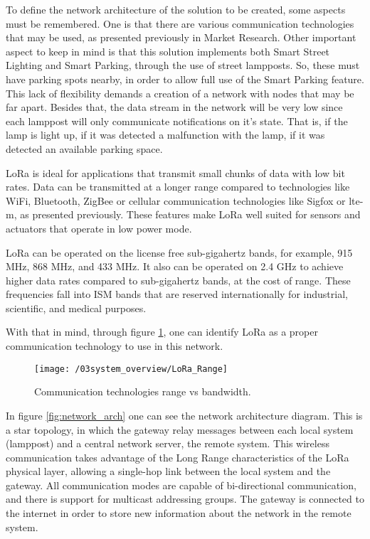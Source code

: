To define the network architecture of the solution to be created, some aspects must be remembered. One is that there are various communication technologies that may be used, as presented previously in Market Research. Other important aspect to keep in mind is that this solution implements both Smart Street Lighting and Smart Parking, through the use of street lampposts. So, these must have parking spots nearby, in order to allow full use of the Smart Parking feature. This lack of flexibility demands a creation of a network with nodes that may be far apart. Besides that, the data stream in the network will be very low since each lamppost will only communicate notifications on it's state. That is, if the lamp is light up, if it was detected a malfunction with the lamp, if it was detected an available parking space. 

LoRa is ideal for applications that transmit small chunks of data with low bit rates. Data can be transmitted at a longer range compared to technologies like WiFi, Bluetooth, ZigBee or cellular communication technologies like Sigfox or \ac{lte-m}, as presented previously. These features make LoRa well suited for sensors and actuators that operate in low power mode.

LoRa can be operated on the license free sub-gigahertz bands, for example, 915 MHz, 868 MHz, and 433 MHz. It also can be operated on 2.4 GHz to achieve higher data rates compared to sub-gigahertz bands, at the cost of range. These frequencies fall into ISM bands that are reserved internationally for industrial, scientific, and medical purposes.

With that in mind, through figure \ref{fig:LoRa_Range}, one can identify LoRa as a proper communication technology to use in this network. 


\begin{figure}[ht]
	\centering
	\texttt{[image: /03system\_overview/LoRa\_Range]}
	\caption{Communication technologies range vs bandwidth.}
	\label{fig:LoRa_Range}
\end{figure}

In figure \ref{fig:network_arch} one can see the network architecture diagram. This is a star topology, in which the gateway relay messages between each local system (lamppost) and a central network server, the remote system. This wireless communication takes advantage of the Long Range characteristics of the LoRa physical layer, allowing a single-hop link between the local system and the gateway. All communication modes are capable of bi-directional communication, and there is support for multicast addressing groups. The gateway is connected to the internet in order to store new information about the network in the remote system.

